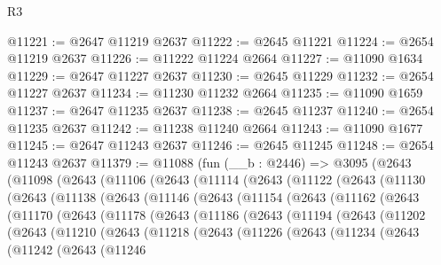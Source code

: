 \begin{lexlean}{R3}
\begin{coremodule}
@11221 := @2647 @11219 @2637
@11222 := @2645 @11221
@11224 := @2654 @11219 @2637
@11226 := @11222 @11224 @2664
@11227 := @11090 @1634
@11229 := @2647 @11227 @2637
@11230 := @2645 @11229
@11232 := @2654 @11227 @2637
@11234 := @11230 @11232 @2664
@11235 := @11090 @1659
@11237 := @2647 @11235 @2637
@11238 := @2645 @11237
@11240 := @2654 @11235 @2637
@11242 := @11238 @11240 @2664
@11243 := @11090 @1677
@11245 := @2647 @11243 @2637
@11246 := @2645 @11245
@11248 := @2654 @11243 @2637
@11379 := @11088
    (fun (__b : @2446) =>
    @3095
      (@2643
        (@11098
          (@2643
            (@11106
              (@2643
                (@11114
                  (@2643
                    (@11122
                      (@2643
                        (@11130
                          (@2643
                            (@11138
                              (@2643
                                (@11146
                                  (@2643
                                    (@11154
                                      (@2643
                                        (@11162
                                          (@2643
                                            (@11170
                                              (@2643
                                                (@11178
                                                  (@2643
                                                    (@11186
                                                      (@2643
                                                        (@11194
                                                          (@2643
                                                            (@11202
                                                              (@2643
                                                                (@11210
                                                                  (@2643
                                                                    (@11218
                                                                      (@2643
                                                                        (@11226
                                                                          (@2643
                                                                            (@11234
                                                                              (@2643
                                                                                (@11242
                                                                                  (@2643
                                                                                    (@11246

\end{coremodule}
\end{lexlean}

